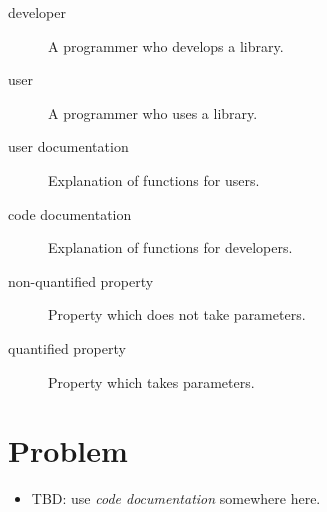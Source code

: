 \documentclass[preprint]{sigplanconf}
\begin{document}
\begin{description}
\item[developer]
    A programmer who develops a library.

\item[user]
    A programmer who uses a library.


\item[user documentation]
    Explanation of functions for users.
\item[code documentation]
    Explanation of functions for developers.

\item[non-quantified property]
    Property which does not take parameters.

\item[quantified property]
    Property which takes parameters.

\end{description}


%
%
%

\section{Problem}
\label{sec:problem}
\begin{itemize}
    \item TBD: use \emph{code documentation} somewhere here.
\end{itemize}
\end{document}
